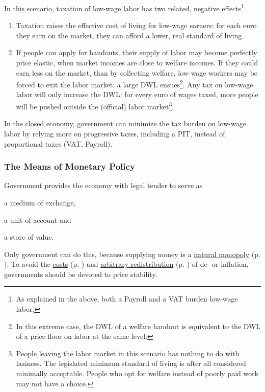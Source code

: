 In this scenario, taxation of low-wage labor has two related, negative effects\footnote{
	As explained in the above, both a \gls{Payroll} and a \gls{VAT} burden low-wage labor.}. 
\begin{enumerate}
	\item Taxation raises the effective cost of living for low-wage earners: for each euro they earn on the market, they can afford a lower, real standard of living. 
	\item If people can apply for handouts, their supply of labor may become perfectly price elastic, when market incomes are close to welfare incomes. If they could earn less on the market, than by collecting welfare, low-wage workers may be forced to exit the labor market: a large \gls{DWL} ensues\footnote{
		In this extreme case, the \gls{DWL} of a welfare handout is equivalent to the \gls{DWL} of a price floor on labor at the same level.}. 
	Any tax on low-wage labor will only increase the \gls{DWL}: for every euro of wages taxed, more people will be pushed outside the (official) labor market\footnote{
		People leaving the labor market in this scenario has nothing to do with laziness. The legislated minimum standard of living is after all considered minimally acceptable. People who opt for welfare instead of poorly paid work may not have a choice.}. 
\end{enumerate}

In the closed economy, government can minimize the tax burden on low-wage labor by relying more on progressive taxes, including a \gls{PIT}, instead of proportional taxes (\gls{VAT}, \gls{Payroll}).


\subsubsection[Monetary Policy]{The Means of Monetary Policy} \label{sec:monetary}
Government provides the economy with legal tender to serve as \begin{inparaenum}[1)] 
	\item a medium of exchange, 
	\item a unit of account and 
	\item a store of value. 
\end{inparaenum} 
Only government can do this, because supplying money is a \hyperref[sec:naturalmonopoly]{natural monopoly} (p. \pageref{sec:naturalmonopoly}). To avoid the \hyperref[sec:pricestability]{costs} (p. \pageref{sec:pricestability}) and  \hyperref[sec:distributive-effects-of-inflation]{arbitrary redistribution} (p. \pageref{sec:distributive-effects-of-inflation}) of de- or inflation, 
governments should be devoted to price stability. 

